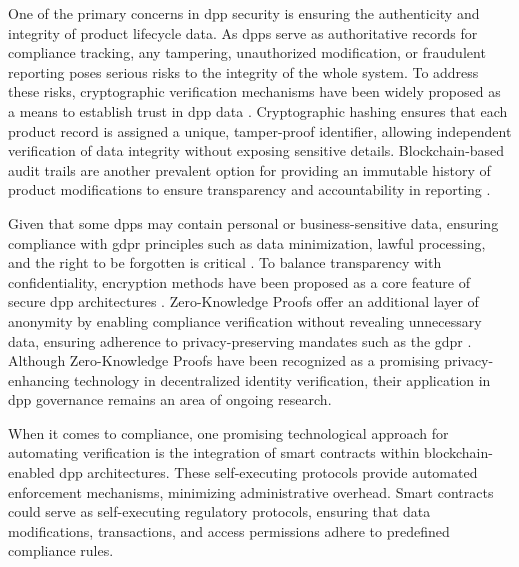 One of the primary concerns in \ac{dpp} security is ensuring the authenticity and integrity of product lifecycle data. As \ac{dpp}s serve as authoritative records for compliance tracking, any tampering, unauthorized modification, or fraudulent reporting poses serious risks to the integrity of the whole system. To address these risks, cryptographic verification mechanisms have been widely proposed as a means to establish trust in \ac{dpp} data \autocite{Garcia.2024, Hulea.2024}. Cryptographic hashing ensures that each product record is assigned a unique, tamper-proof identifier, allowing independent verification of data integrity without exposing sensitive details. Blockchain-based audit trails are another prevalent option for providing an immutable history of product modifications to ensure transparency and accountability in reporting \autocite{Dalipi.2024}. 

Given that some \ac{dpp}s may contain personal or business-sensitive data, ensuring compliance with \ac{gdpr} principles such as data minimization, lawful processing, and the right to be forgotten is critical \autocite{EuropeanParliamentandCouncil.2016, Pietron.2023}. To balance transparency with confidentiality, encryption methods have been proposed as a core feature of secure \ac{dpp} architectures \autocite{Hulea.2024}. Zero-Knowledge Proofs offer an additional layer of anonymity by enabling compliance verification without revealing unnecessary data, ensuring adherence to privacy-preserving mandates such as the \ac{gdpr} \autocite{Zyskind.2015}.  Although Zero-Knowledge Proofs have been recognized as a promising privacy-enhancing technology in decentralized identity verification, their application in \ac{dpp} governance remains an area of ongoing research.

When it comes to compliance, one promising technological approach for automating verification is the integration of smart contracts within blockchain-enabled \ac{dpp} architectures. These self-executing protocols provide automated enforcement mechanisms, minimizing administrative overhead. Smart contracts could serve as self-executing regulatory protocols, ensuring that data modifications, transactions, and access permissions adhere to predefined compliance rules. \autocite{Hulea.2024, Nowacki.2023}

